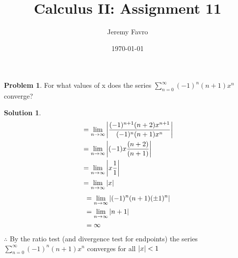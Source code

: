 \documentclass[10pt]{article}
\title{Calculus II: Assignment 11}
\author{Jeremy Favro}
\date{\today}
\theoremstyle{definition}
\newtheorem{problem}{Problem}
\newtheorem{soln}{Solution}
\begin{document}
\maketitle

\begin{problem}
For what values of x does the series $\displaystyle \sum_{n = 0}^{\infty} (-1)^n(n+1)x^n$ converge?
\end{problem}
\begin{soln}
      \begin{align*}
             & = \lim_{n \to \infty} \abs{\frac{(-1)^{n+1}(n+2)x^{n+1}}{(-1)^n(n+1)x^n}} \\
             & = \lim_{n \to \infty} \abs{(-1)x\frac{(n+2)}{(n+1)}}                      \\
             & = \lim_{n \to \infty} \abs{x\frac{1}{1}}                                  \\
             & = \lim_{n \to \infty} \abs{x}                                             \\
      \end{align*}
      \begin{align*}
             & = \lim_{n \to \infty} \abs{(-1)^n(n+1)(\pm 1)^n} \\
             & = \lim_{n \to \infty} \abs{n+1}                  \\
             & = \infty                                         \\
      \end{align*}
      \noindent $\therefore$ By the ratio test (and divergence test for endpoints) the series $\displaystyle \sum_{n = 0}^{\infty} (-1)^n(n+1)x^n$ converges for all $\abs{x}<1$
\end{soln}
\end{document}
